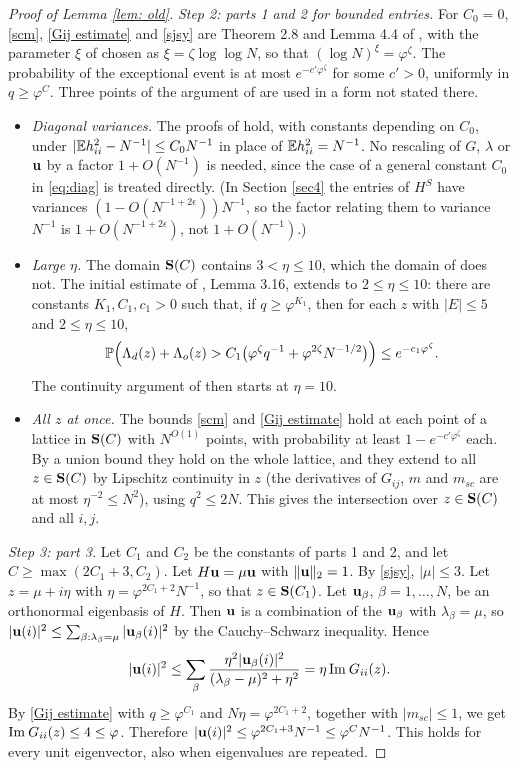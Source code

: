 \begin{proof}[Proof of Lemma \ref{lem: old}]
{\it Step 2: parts 1 and 2 for bounded entries.} For $C_0=0$, \eqref{scm}, \eqref{Gij estimate} and \eqref{sjsy} are Theorem 2.8 and Lemma 4.4 of \cite{EKYY1}, with the parameter $\xi$ of \cite{EKYY1} chosen as $\xi=\zeta\log\log N$, so that $(\log N)^{\xi}=\varphi^\zeta$. The probability of the exceptional event is at most $e^{-c'\varphi^\zeta}$ for some $c'>0$, uniformly in $q\ge\varphi^C$. Three points of the argument of \cite{EKYY1} are used in a form not stated there.
\begin{itemize}
\item {\it Diagonal variances.} The proofs of \cite{EKYY1} hold, with constants depending on $C_0$, under $|\mathbb{E} h_{ii}^2-N^{-1}|\le C_0N^{-1}$ in place of $\mathbb{E} h_{ii}^2=N^{-1}$. No rescaling of $G$, $\lambda$ or ${\bf u}$ by a factor $1+O(N^{-1})$ is needed, since the case of a general constant $C_0$ in \eqref{eq:diag} is treated directly. (In Section \ref{sec4} the entries of $H^S$ have variances $(1-O(N^{-1+2\epsilon}))N^{-1}$, so the factor relating them to variance $N^{-1}$ is $1+O(N^{-1+2\epsilon})$, not $1+O(N^{-1})$.)
\item {\it Large $\eta$.} The domain ${\bf S}(C)$ contains $3<\eta\le10$, which the domain of \cite{EKYY1} does not. The initial estimate of \cite{EKYY1}, Lemma 3.16, extends to $2\le\eta\le10$: there are constants $K_1,C_1,c_1>0$ such that, if $q\ge\varphi^{K_1}$, then for each $z$ with $|E|\le5$ and $2\le\eta\le10$,
$$
\mathbb{P}\Big(\Lambda_d(z)+\Lambda_o(z)> C_1\big(\varphi^\zeta q^{-1}+\varphi^{2\zeta}N^{-1/2}\big)\Big)\le e^{-c_1\varphi^\zeta}.
$$
The continuity argument of \cite{EKYY1} then starts at $\eta=10$.
\item {\it All $z$ at once.} The bounds \eqref{scm} and \eqref{Gij estimate} hold at each point of a lattice in ${\bf S}(C)$ with $N^{O(1)}$ points, with probability at least $1-e^{-c'\varphi^\zeta}$ each. By a union bound they hold on the whole lattice, and they extend to all $z\in{\bf S}(C)$ by Lipschitz continuity in $z$ (the derivatives of $G_{ij}$, $m$ and $m_{sc}$ are at most $\eta^{-2}\le N^2$), using $q^2\le 2N$. This gives the intersection over $z\in{\bf S}(C)$ and all $i,j$.
\end{itemize}

{\it Step 3: part 3.} Let $C_1$ and $C_2$ be the constants of parts 1 and 2, and let $C\ge\max(2C_1+3,C_2)$. Let $H{\bf u}=\mu{\bf u}$ with $\|{\bf u}\|_2=1$. By \eqref{sjsy}, $|\mu|\le3$. Let $z=\mu+i\eta$ with $\eta=\varphi^{2C_1+2}N^{-1}$, so that $z\in{\bf S}(C_1)$. Let ${\bf u}_\beta$, $\beta=1,\dots,N$, be an orthonormal eigenbasis of $H$. Then ${\bf u}$ is a combination of the ${\bf u}_\beta$ with $\lambda_\beta=\mu$, so $|{\bf u}(i)|^2\le\sum_{\beta:\lambda_\beta=\mu}|{\bf u}_\beta(i)|^2$ by the Cauchy--Schwarz inequality. Hence
$$
|{\bf u}(i)|^2\le\sum_\beta\frac{\eta^2|{\bf u}_\beta(i)|^2}{(\lambda_\beta-\mu)^2+\eta^2}=\eta\,\mathrm{Im}\: G_{ii}(z).
$$
By \eqref{Gij estimate} with $q\ge\varphi^{C_1}$ and $N\eta=\varphi^{2C_1+2}$, together with $|m_{sc}|\le1$, we get $\mathrm{Im}\: G_{ii}(z)\le4\le\varphi$. Therefore $|{\bf u}(i)|^2\le\varphi^{2C_1+3}N^{-1}\le\varphi^CN^{-1}$. This holds for every unit eigenvector, also when eigenvalues are repeated.


\end{proof}
